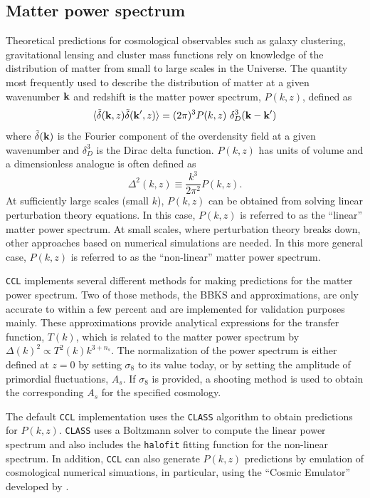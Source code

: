 \documentclass[\docopts]{\docclass}
\newcommand{\ccl}{{\tt CCL}\xspace}
\newcommand{\halofit}{{\tt halofit}\xspace}
\newcommand{\class}{{\tt CLASS}\xspace}
\begin{document}
\subsection{Matter power spectrum}
\label{sec:matterps}

Theoretical predictions for cosmological observables such as galaxy clustering, gravitational lensing and cluster mass functions rely on knowledge of the distribution of matter from small to large scales in the Universe. The quantity most frequently used to describe the distribution of matter at a given wavenumber ${\bf k}$ and redshift is the matter power spectrum, $P(k,z)$, defined as
\begin{equation}
  \langle \tilde\delta({\bf k},z)\tilde\delta({\bf k}^\prime,z)\rangle = (2\pi)^3P(k,z)\
\delta_D^3({\bf k}-{\bf k}')
\end{equation}
where $\tilde\delta({\bf k})$ is the Fourier component of the overdensity field at a given wavenumber and $\delta_D^3$ is the Dirac delta function. $P(k,z)$ has units of volume and a dimensionless analogue is often defined as
\begin{equation}
  \Delta^2(k,z) \equiv \frac{k^3}{2\pi^2}P(k,z).
\end{equation}
At sufficiently large scales (small $k$), $P(k,z)$ can be obtained from solving linear perturbation theory equations. In this case, $P(k,z)$ is referred to as the ``linear'' matter power spectrum. At small scales, where perturbation theory breaks down, other approaches based on numerical simulations are needed. In this more general case, $P(k,z)$ is referred to as the ``non-linear'' matter power spectrum.

\ccl implements several different methods for making predictions for the matter power spectrum. Two of those methods, the BBKS \citep{BBKS} and \citet{1998ApJ...496..605E} approximations, are only accurate to within a few percent and are implemented for validation purposes mainly. These approximations provide analytical expressions for the transfer function, $T(k)$, which is related to the matter power spectrum by $\Delta(k)^2 \propto T^2(k) k^{3+n_s}$. The normalization of the power spectrum is either defined at $z=0$ by setting $\sigma_8$ to its value today, or by setting the amplitude of primordial fluctuations, $A_s$. If $\sigma_8$ is provided, a shooting method is used to obtain the corresponding $A_s$ for the specified cosmology.

The default \ccl implementation uses the \class algorithm \citet{class} to obtain predictions for $P(k,z)$. \class uses a Boltzmann solver to compute the linear power spectrum and also includes the \halofit \citep{Smith2003,CLASS_halofit} fitting function for the non-linear spectrum. In addition, \ccl can also generate $P(k,z)$ predictions by emulation of cosmological numerical simuations, in particular, using the ``Cosmic Emulator'' developed by \citet{Lawrence17}.
\end{document}
